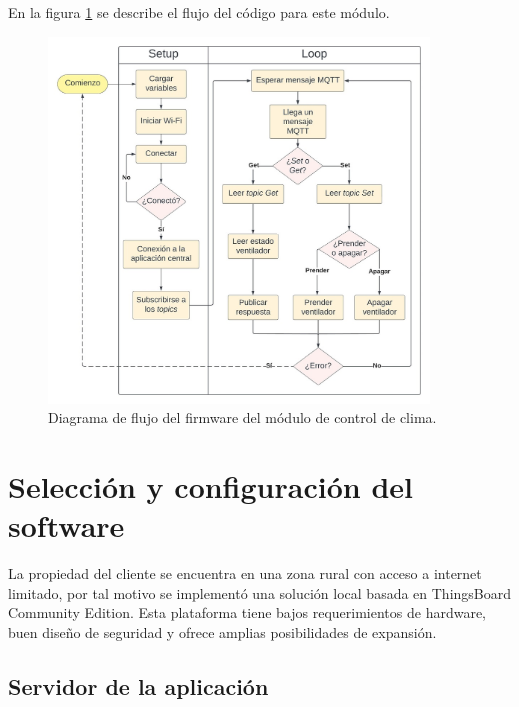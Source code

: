 En la figura \ref{fig:flow_climacontrol} se describe el flujo del código para este módulo.

\begin{figure}[!h]
	\centering
	\includegraphics[width=0.9\textwidth]{./Figures/chapter3/FirmwareVentControl.jpg}
	\caption[Diagrama de flujo del firmware del módulo de control de clima]{Diagrama de flujo del firmware del módulo de control de clima.}
	\label{fig:flow_climacontrol}
\end{figure}









\section{Selección y configuración del software}
\label{sec:Selección y configuración del software}

La propiedad del cliente se encuentra en una zona rural con acceso a internet limitado, por tal motivo se implementó una solución local basada en  ThingsBoard Community Edition.
Esta plataforma tiene bajos requerimientos de hardware, buen diseño de seguridad y ofrece amplias posibilidades de expansión.

\subsection{Servidor de la aplicación}
\label{sec:Servidor de la aplicación}

